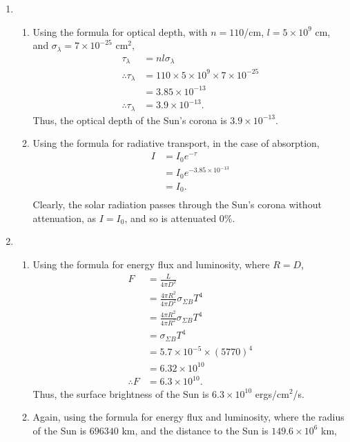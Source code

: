 \documentclass[a4paper,11pt]{article}
\newcommand{\ds}{\displaystyle}
\begin{document}
{{\begin{enumerate}[leftmargin=*]
		\item \begin{enumerate}[label=\alph*)]
			\item Using the formula for optical depth, with $\ds{n = 110}$/cm, $\ds{l = 5\times 10^9}$ cm, and $\ds{\sigma_{\lambda} = 7\times 10^{-25}}$ $\ds{\text{cm}^2}$, 
				\begin{align*}
					\tau_{\lambda} & = nl\sigma_{\lambda} \\
					\therefore \tau_{\lambda} & = 110 \times 5 \times 10^9 \times 7 \times 10^{-25} \\
											  & = 3.85 \times 10^{-13} \\
					\therefore \tau_{\lambda} & = 3.9\times 10^{-13}.
				\end{align*}
				Thus, the optical depth of the Sun's corona is $\ds{3.9\times 10^{-13}}$.
			\item Using the formula for radiative transport, in the case of absorption,
				\begin{align*}
					I & = I_0 e^{-\tau} \\
					  & = I_0 e^{-3.85 \times 10^{-13}} \\
					  & = I_0. \\
				\end{align*}
				Clearly, the solar radiation passes through the Sun's corona without attenuation, as $\ds{I=I_0}$, and so is attenuated $\ds{0\%}$.
		\end{enumerate}
		\item \begin{enumerate}[label=\alph*)]
			\item Using the formula for energy flux and luminosity, where $\ds{R = D}$, 
				\begin{align*}
					F & = \frac{L}{4\pi D^2} \\
					  & = \frac{4 \pi R^2}{4\pi D^2} \sigma_{\Sigma B} T^4 \\
					  & = \frac{4 \pi R^2}{4\pi R^2} \sigma_{\Sigma B} T^4 \\
					  & = \sigma_{\Sigma B} T^4 \\
					  & = 5.7 \times 10^{-5} \times (5770)^4 \\
					  & = 6.32 \times 10^{10} \\
					\therefore F & = 6.3 \times 10^{10}.
				\end{align*}
				Thus, the surface brightness of the Sun is $\ds{6.3 \times 10^{10}}$ ergs/$\ds{\text{cm}^2}$/s.
			\item Again, using the formula for energy flux and luminosity, where the radius of the Sun is $\ds{696340}$ km, and the distance to the Sun is $\ds{149.6\times 10^6}$ km, 

\end{enumerate}
\end{enumerate}}}
\end{document}

